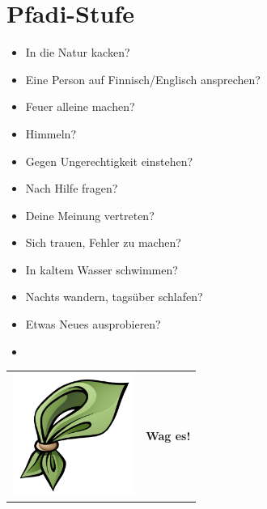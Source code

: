 \section*{Pfadi-Stufe}

\begin{itemize}
	\item In die Natur kacken?
	\item Eine Person auf Finnisch/Englisch ansprechen?
	\item Feuer alleine machen?
	\item Himmeln?
	\item Gegen Ungerechtigkeit einstehen?
	\item Nach Hilfe fragen?
	\item Deine Meinung vertreten?
	\item Sich trauen, Fehler zu machen?
	\item In kaltem Wasser schwimmen?
	\item Nachts wandern, tagsüber schlafen?
	\item Etwas Neues ausprobieren?
	\vspace{1em}
	\item \dotfill
\end{itemize}
\vspace{2em}


\vfill
\begin{center}
	\begin{tabular}{m{3cm} m{5cm}}
			\includegraphics[height=4cm]{Ausgaben/Sola24/Grafiken/lebensstil.png} & \Huge \textbf{Wag es!}
	\end{tabular}
\end{center}